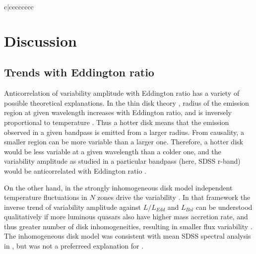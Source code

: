 \documentclass[twocolumn]{aastex62}
\begin{document}
\begin{deluxetable*}{c|cccccccc}
\end{deluxetable*}





\section{Discussion}
\label{sec:discussion}
\subsection{Trends with Eddington ratio}
Anticorrelation of  variability amplitude with Eddington ratio  has a variety of possible theoretical explanations. In the thin disk theory \citep{shakura1973, frank2002, netzer2013}, radius of the emission region at given wavelength increases with Eddington ratio, and is inversely proportional to temperature \citep{rakshit2017}. Thus a hotter disk means that the emission observed in a given bandpass is emitted from a larger radius. From causality, a smaller region can be more variable than a larger one. Therefore, a  hotter disk would be less variable at a given wavelength than a colder one, and  the variability amplitude as studied in a particular bandpass (here, SDSS r-band) would be anticorrelated with Eddington ratio \citep{fausnaugh2016,edelson2015}. 

On the other hand, in the strongly inhomogeneous disk model independent temperature fluctuations in $N$ zones drive the variability \citep{dexter2011}. In that framework the inverse trend of variability amplitude against $L/L_{Edd}$  and $L_{Bol}$  can be understood qualitatively if more luminous quasars also have higher mass accretion rate, and thus greater number of disk inhomogeneities, resulting in smaller flux variability \citep{simm2016}. The inhomogeneous disk model was consistent with mean SDSS spectral analysis in \citet{ruan2014}, but was not a preferreed explanation for \citet{kokubo2015}. 
\end{document}
